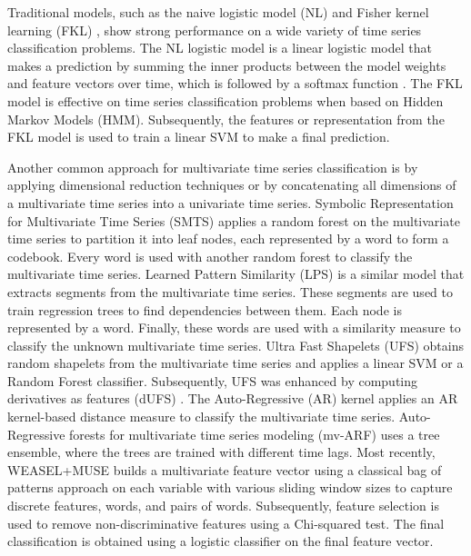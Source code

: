 \documentclass[preprint,12pt,3p]{elsarticle}
\begin{document}
Traditional models, such as the naive logistic model (NL) and Fisher kernel learning (FKL) \cite{jaakkola2000discriminative}, show strong performance on a wide variety of time series classification problems. The NL logistic model is a linear logistic model that makes a prediction by summing the inner products between the model weights and feature vectors over time, which is followed by a softmax function \cite{pei2017multivariate}. The FKL model is effective on time series classification problems when based on Hidden Markov Models (HMM). Subsequently, the features or representation from the FKL model is used to train a linear SVM to make a final prediction. \cite{jaakkola2000discriminative,maaten2011learning}

Another common approach for multivariate time series classification is by applying dimensional reduction techniques or by concatenating all dimensions of a multivariate time series into a univariate time series. Symbolic Representation for Multivariate Time Series (SMTS) \cite{SMTS} applies a random forest on the multivariate time series to partition it into leaf nodes, each represented by a word to form a codebook. Every word is used with another random forest to classify the multivariate time series. Learned Pattern Similarity (LPS) \cite{LPS} is a similar model that extracts segments from the multivariate time series. These segments are used to train regression trees to find dependencies between them. Each node is represented by a word. Finally, these words are used with a similarity measure to classify the unknown multivariate time series. Ultra Fast Shapelets (UFS) \cite{UFS} obtains random shapelets from the multivariate time series and applies a linear SVM or a Random Forest classifier. Subsequently, UFS was enhanced by computing derivatives as features (dUFS) \cite{UFS}. The Auto-Regressive (AR) kernel \cite{ARkernel} applies an AR kernel-based distance measure to classify the multivariate time series. Auto-Regressive forests for multivariate time series modeling (mv-ARF) \cite{mvARF} uses a tree ensemble, where the trees are trained with different time lags. Most recently, WEASEL+MUSE \cite{schafer2017multivariate} builds a multivariate feature vector using a classical bag of patterns approach on each variable with various sliding window sizes to capture discrete features, words, and pairs of words. Subsequently, feature selection is used to remove non-discriminative features using a Chi-squared test. The final classification is obtained using a logistic classifier on the final feature vector.   
\end{document}
